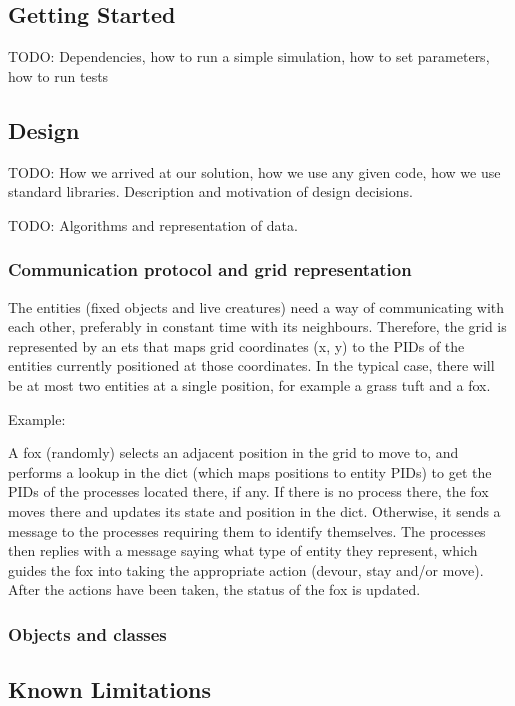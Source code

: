 \documentclass[12pt]{article}
\begin{document}
\subsection{Getting Started}

TODO: Dependencies, how to run a simple simulation, how to set parameters, how to run tests

\subsection{Design}

TODO: How we arrived at our solution, how we use any given code, how we use standard libraries. Description and motivation of design decisions.

TODO: Algorithms and representation of data.

\subsubsection{Communication protocol and grid representation}

The entities (fixed objects and live creatures) need a way of communicating with each other, preferably in constant time with its neighbours. Therefore, the grid is represented by an ets that maps grid coordinates (x, y) to the PIDs of the entities currently positioned at those coordinates. In the typical case, there will be at most two entities at a single position, for example a grass tuft and a fox.

Example:

A fox (randomly) selects an adjacent position in the grid to move to, and performs a lookup in the dict (which maps positions to entity PIDs) to get the PIDs of the processes located there, if any. 
If there is no process there, the fox moves there and updates its state and position in the dict. 
Otherwise, it sends a message to the processes requiring them to identify themselves. 
The processes then replies with a message saying what type of entity they represent,
which guides the fox into taking the appropriate action (devour, stay and/or move).
After the actions have been taken, the status of the fox is updated.

\subsubsection{Objects and classes}

\subsection{Known Limitations}
\end{document}
